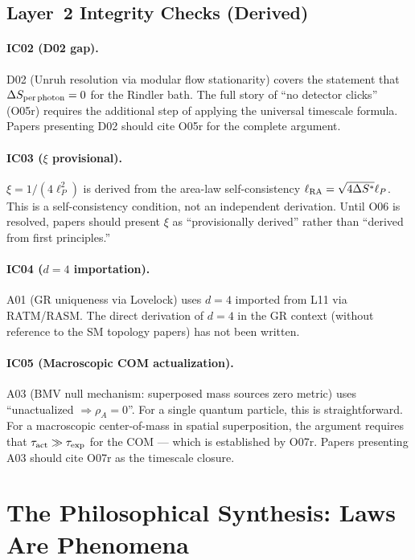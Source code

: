 \documentclass[12pt,a4paper]{article}
\begin{document}
\subsection{Layer~2 Integrity Checks (Derived)}

\paragraph{IC02 (D02 gap).}
D02 (Unruh resolution via modular flow stationarity) covers the statement that $\Delta S_{\rm per\,photon}=0$ for the Rindler bath.  The full story of ``no detector clicks'' (O05r) requires the additional step of applying the universal timescale formula.  Papers presenting D02 should cite O05r for the complete argument.

\paragraph{IC03 ($\xi$ provisional).}
$\xi=1/(4\ell_P^2)$ is derived from the area-law self-consistency $\ell_{\rm RA}=\sqrt{4\Delta S^*}\ell_P$.  This is a self-consistency condition, not an independent derivation.  Until O06 is resolved, papers should present $\xi$ as ``provisionally derived'' rather than ``derived from first principles.''

\paragraph{IC04 ($d=4$ importation).}
A01 (GR uniqueness via Lovelock) uses $d=4$ imported from L11 via RATM/RASM.  The direct derivation of $d=4$ in the GR context (without reference to the SM topology papers) has not been written.

\paragraph{IC05 (Macroscopic COM actualization).}
A03 (BMV null mechanism: superposed mass sources zero metric) uses ``unactualized $\Rightarrow \rho_A=0$''.  For a single quantum particle, this is straightforward.  For a macroscopic center-of-mass in spatial superposition, the argument requires that $\tau_{\rm act}\gg\tau_{\rm exp}$ for the COM --- which is established by O07r.  Papers presenting A03 should cite O07r as the timescale closure.

\section{The Philosophical Synthesis: Laws Are Phenomena}\label{sec:philosophy_full}
\end{document}
